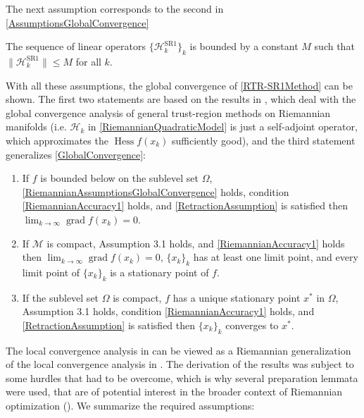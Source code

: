 The next assumption corresponds to the second in \cref{AssumptionsGlobalConvergence}
\begin{assumption}\label{RiemannianAssumptionsGlobalConvergence} 
    The sequence of linear operators $\{ \mathcal{H}^{\mathrm{SR1}}_k \}_k$ is bounded by a constant $M$ such that $\lVert \mathcal{H}^{\mathrm{SR1}}_k \rVert \leq M$ for all $k$.
\end{assumption}
With all these assumptions, the global convergence of \cref{RTR-SR1Method} can be shown. The first two statements are based on the results in \cite[7.4.1~Global~convergence]{AbsilMahonySepulchre:2008}, which deal with the global convergence analysis of general trust-region methods on Riemannian manifolds (i.e. $\mathcal{H}_k$ in \cref{RiemannianQuadraticModel} is just a self-adjoint operator, which approximates the $\operatorname{Hess} f(x_k)$ sufficiently good), and the third statement generalizes \cref{GlobalConvergence}:
\begin{theorem} \label{RiemannianGlobalConvergence}
    \begin{enumerate}
        \item If $f$ is bounded below on the sublevel set $\Omega$, \cref{RiemannianAssumptionsGlobalConvergence} holds, condition \cref{RiemannianAccuracy1} holds, and \cref{RetractionAssumption} is satisfied then $\lim_{k \rightarrow \infty} \operatorname{grad} f(x_k) = 0$.
        \item If $\mathcal{M}$ is compact, Assumption 3.1 holds, and \cref{RiemannianAccuracy1} holds then $\lim_{k \rightarrow \infty} \operatorname{grad} f(x_k) = 0$, $\{ x_k \}_k$ has at least one limit point, and every limit point of $\{ x_k \}_k$ is a stationary point of $f$.
        \item If the sublevel set $\Omega$ is compact, $f$ has a unique stationary point $x^*$ in $\Omega$, Assumption 3.1 holds, condition \cref{RiemannianAccuracy1} holds, and \cref{RetractionAssumption} is satisfied then $\{ x_k \}_k$ converges to $x^*$.
    \end{enumerate}
\end{theorem}
The local convergence analysis in \cite{HuangAbsilGallivan:2014} can be viewed as a Riemannian generalization of the local convergence analysis in \cite{ByrdKhalfanSchnabel:1996}. The derivation of the results was subject to some hurdles that had to be overcome, which is why several preparation lemmata were used, that are of potential interest in the broader context of Riemannian optimization (). We summarize the required assumptions:

